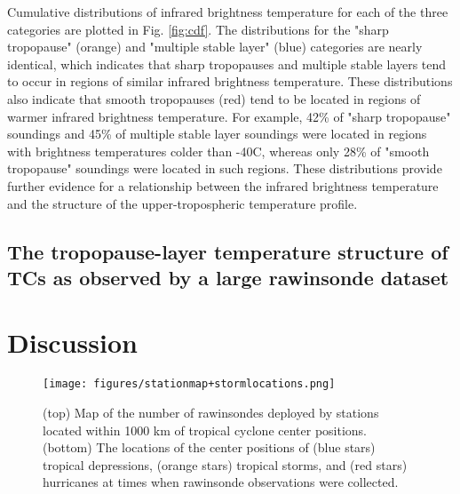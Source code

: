 Cumulative distributions of infrared brightness temperature for each of the three categories are plotted in Fig. \ref{fig:cdf}.
The distributions for the "sharp tropopause" (orange) and "multiple stable layer" (blue) categories are nearly identical, which indicates that sharp tropopauses and multiple stable layers tend to occur in regions of similar infrared brightness temperature.
These distributions also indicate that smooth tropopauses (red) tend to be located in regions of warmer infrared brightness temperature.
For example, 42\% of "sharp tropopause" soundings and 45\% of multiple stable layer soundings were located in regions with brightness temperatures colder than -40\textdegree{}C, whereas only 28\% of "smooth tropopause" soundings were located in such regions.
These distributions provide further evidence for a relationship between the infrared brightness temperature and the structure of the upper-tropospheric temperature profile.

\subsection{The tropopause-layer temperature structure of TCs as observed by a large rawinsonde dataset}



\section{Discussion}
\label{sec:discussion}


\begin{figure*}[ht]
\centerline{\texttt{[image: figures/stationmap+stormlocations.png]}}
\caption{(top) Map of the number of rawinsondes deployed by stations located within 1000 km of tropical cyclone center positions. (bottom) The locations of the center positions of (blue stars) tropical depressions, (orange stars) tropical storms, and (red stars) hurricanes at times when rawinsonde observations were collected.}
\label{fig:maps}
\end{figure*}

